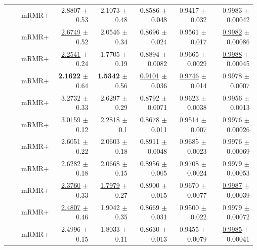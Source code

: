 \begin{longtable}{llp{}rrrrr}
 &  & mRMR+ & 2.8807 {\scriptsize $\pm$ 0.53} & 2.1073 {\scriptsize $\pm$ 0.48} & 0.8586 {\scriptsize $\pm$ 0.048} & 0.9417 {\scriptsize $\pm$ 0.032} & 0.9983 {\scriptsize $\pm$ 0.00042} \\
 &  & mRMR+ & \underline{2.6749} {\scriptsize $\pm$ 0.52} & 2.0546 {\scriptsize $\pm$ 0.34} & 0.8696 {\scriptsize $\pm$ 0.024} & 0.9561 {\scriptsize $\pm$ 0.017} & \underline{0.9982} {\scriptsize $\pm$ 0.00086} \\
 &  & mRMR+ & \underline{2.2541} {\scriptsize $\pm$ 0.24} & 1.7705 {\scriptsize $\pm$ 0.19} & 0.8894 {\scriptsize $\pm$ 0.0082} & 0.9665 {\scriptsize $\pm$ 0.0029} & \underline{0.9988} {\scriptsize $\pm$ 0.00045} \\
 &  & mRMR+ & \textbf{2.1622} {\scriptsize $\pm$ 0.64} & \textbf{1.5342} {\scriptsize $\pm$ 0.56} & \underline{0.9101} {\scriptsize $\pm$ 0.036} & \underline{0.9746} {\scriptsize $\pm$ 0.014} & 0.9978 {\scriptsize $\pm$ 0.0007} \\
 &  & mRMR+ & 3.2732 {\scriptsize $\pm$ 0.33} & 2.6297 {\scriptsize $\pm$ 0.29} & 0.8792 {\scriptsize $\pm$ 0.0071} & 0.9623 {\scriptsize $\pm$ 0.0038} & 0.9956 {\scriptsize $\pm$ 0.0013} \\
 &  & mRMR+ & 3.0159 {\scriptsize $\pm$ 0.12} & 2.2818 {\scriptsize $\pm$ 0.1} & 0.8678 {\scriptsize $\pm$ 0.011} & 0.9514 {\scriptsize $\pm$ 0.007} & 0.9976 {\scriptsize $\pm$ 0.00026} \\
 &  & mRMR+ & 2.6051 {\scriptsize $\pm$ 0.22} & 2.0603 {\scriptsize $\pm$ 0.18} & 0.8911 {\scriptsize $\pm$ 0.0048} & 0.9685 {\scriptsize $\pm$ 0.0023} & 0.9976 {\scriptsize $\pm$ 0.00069} \\
 &  & mRMR+ & 2.6282 {\scriptsize $\pm$ 0.18} & 2.0668 {\scriptsize $\pm$ 0.15} & 0.8956 {\scriptsize $\pm$ 0.005} & 0.9708 {\scriptsize $\pm$ 0.0024} & 0.9979 {\scriptsize $\pm$ 0.00053} \\
 &  & mRMR+ & \underline{2.3760} {\scriptsize $\pm$ 0.33} & \underline{1.7979} {\scriptsize $\pm$ 0.27} & 0.8900 {\scriptsize $\pm$ 0.015} & 0.9670 {\scriptsize $\pm$ 0.0077} & \underline{0.9987} {\scriptsize $\pm$ 0.00039} \\
 &  & mRMR+ & \underline{2.4807} {\scriptsize $\pm$ 0.46} & 1.9042 {\scriptsize $\pm$ 0.35} & 0.8669 {\scriptsize $\pm$ 0.031} & 0.9500 {\scriptsize $\pm$ 0.022} & 0.9979 {\scriptsize $\pm$ 0.00072} \\
 &  & mRMR+ & 2.4996 {\scriptsize $\pm$ 0.15} & 1.8033 {\scriptsize $\pm$ 0.11} & 0.8630 {\scriptsize $\pm$ 0.013} & 0.9455 {\scriptsize $\pm$ 0.0079} & \underline{0.9985} {\scriptsize $\pm$ 0.00041} \\

\end{longtable}
